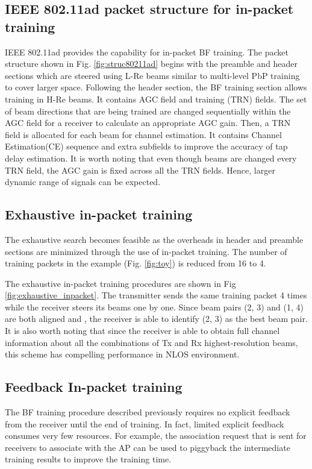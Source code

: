 \documentclass[10pt,conference]{IEEEtran}
\begin{document}
\subsection{IEEE 802.11ad packet structure for in-packet training}
IEEE 802.11ad provides the capability for in-packet BF training. The packet structure shown in Fig. \ref{fig:struc80211ad} begins with the preamble and header sections which are steered using L-Re beams similar to multi-level PbP training to cover larger space. Following the header section, the BF training section allows training in H-Re beams. It contains AGC field and training (TRN) fields. The set of beam directions that are being trained are changed sequentially within the AGC field for a receiver to calculate an appropriate AGC gain. Then, a TRN field is allocated for each beam for channel estimation. It contains Channel Estimation(CE) sequence and extra subfields to improve the accuracy of tap delay estimation. It is worth noting that even though beams are changed every TRN field, the AGC gain is fixed across all the TRN fields. Hence, larger dynamic range of signals can be expected.

\subsection{Exhaustive in-packet training}
The exhaustive search becomes feasible as the overheads in header and preamble sections are minimized through the use of in-packet training. The number of training packets in the example (Fig. \ref{fig:toy}) is reduced from 16 to 4.

The exhaustive in-packet training procedures are shown in Fig
\ref{fig:exhaustive_inpacket}. The transmitter sends the same training
packet 4 times while the receiver steers its beams one by one. Since beam pairs
(2, 3) and (1, 4) are both aligned and , the receiver is able to identify
(2, 3) as the best beam pair. It is also worth noting that since the receiver is
able to obtain full channel information about all the combinations of Tx and Rx
highest-resolution beams, this scheme has compelling performance in NLOS environment.

\subsection{Feedback In-packet training} \label{sec:feedback}
The BF training procedure described previously requires no explicit feedback from the
receiver until the end of training. In fact, limited explicit feedback consumes very few resources. For example, the association request that is sent for receivers to associate with the AP can be used to piggyback the intermediate training results to improve the training time.
\end{document}
